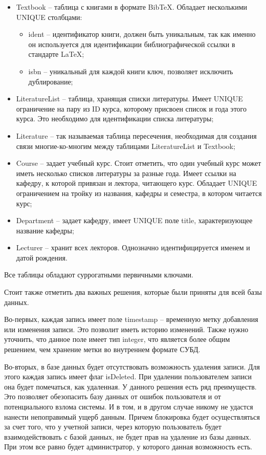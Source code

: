 \begin{itemize}
	\item Textbook -- таблица с книгами в формате BibTeX. Обладает несколькими UNIQUE столбцами:
	      \begin{itemize}
	      	\item ident -- идентификатор книги, должен быть уникальным, так как именно
	      	      он используется для идентификации библиографической ссылки в стандарте LaTeX;
	      	\item isbn -- уникальный для каждой книги ключ, позволяет исключить дублирование;
	      \end{itemize}
	\item LiteratureList -- таблица, хранящая списки литературы. Имеет UNIQUE ограничение на
	      пару из ID курса, которому присвоен список и года этого курса. Это необходимо для
	      идентификации списка литературы;
	\item Literature -- так называемая таблица пересечения, необходимая для создания связи
	      многие-ко-многим между таблицами LiteratureList и Textbook;
	\item Course -- задает учебный курс. Стоит отметить, что один учебный курс может иметь
	      несколько списков литературы за разные года. Имеет ссылки на кафедру, к которой 
	      привязан и лектора, читающего курс. Обладает UNIQUE ограничением на тройку из
	      названия, кафедры и семестра, в котором читается курс;
	\item Department -- задает кафедру, имеет UNIQUE поле title, характеризующее
	      название кафедры;
	\item Lecturer -- хранит всех лекторов. Однозначно идентифицируется именем и датой рождения.
\end{itemize}

Все таблицы обладают суррогатными первичными ключами.

Стоит также отметить два важных решения, которые были приняты для всей базы данных.

Во-первых, каждая запись имеет поле timestamp -- временную метку добавления или изменения записи.
Это позволит иметь историю изменений. Также нужно уточнить, что данное поле имеет тип integer,
что является более общим решением, чем хранение метки во внутреннем формате СУБД.

Во-вторых, в базе данных будет отсутствовать возможность удаления записи. Для этого каждая
запись имеет флаг isDeleted. При удалении пользователем записи она будет помечаться, как удаленная.
У данного решения есть ряд преимуществ. Это позволяет обезопасить базу данных от ошибок пользователя
и от потенциального взлома системы. И в том, и в другом случае никому не удастся нанести
непоправимый ущерб данным. Причем блокировка будет осуществляться за счет того, что у учетной записи,
через которую пользователь будет взаимодействовать с базой данных, не будет прав на удаление из базы данных.
При этом все равно будет администратор, у которого данная возможность есть.

